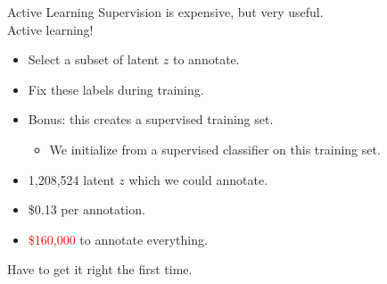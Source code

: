 \begin{frame}{Active Learning}
  Supervision is expensive,
  but very useful. \\
\vspace{0.25cm}
 Active learning! \\
\pause
\begin{itemize}
  \item Select a subset of latent $z$ to annotate.
  \item Fix these labels during training.
  \pause
  \item Bonus: this creates a supervised training set.
  \begin{itemize}
    \item We initialize from a supervised classifier on this training set.
  \end{itemize}
\end{itemize}
\vspace{0.5cm}
\pause

\begin{itemize}
  \item 1,208,524 latent $z$ which we could annotate.
  \item \$0.13 per annotation.
  \item \textcolor{red}{\$160,000} to annotate everything.
\end{itemize}
\vspace{0.5cm}
\pause

 Have to get it right the first time.
\end{frame}

